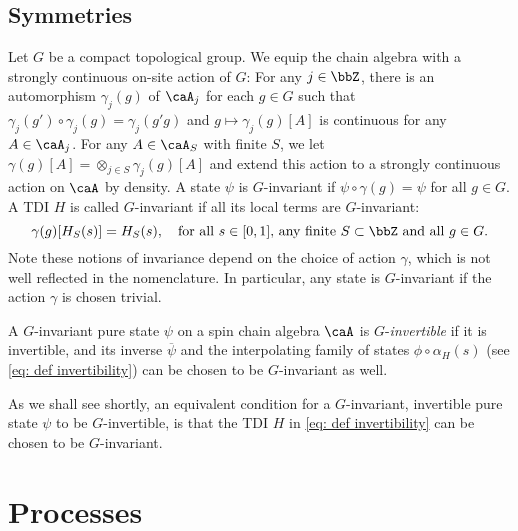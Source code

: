 \subsection{Symmetries}\label{sec: symmetries}
Let $G$ be a compact topological group. We equip the chain algebra with a strongly continuous on-site action of $G$: For any $j\in \bbZ$, there is an automorphism $\gamma_{j}(g)$ of $\caA_j$ for each $g\in G$ such that $\gamma_{j}(g')\circ \gamma_{j}(g)=\gamma_{j}(g'g)$ and $g\mapsto \gamma_j(g)[A]$ is continuous for any $A\in \caA_j$. For any $A\in\caA_S$ with finite $S$, we let $\gamma(g)[A]=\otimes_{j\in S}\gamma_{j}(g)[A]$ and extend this action to a strongly continuous action  on $\caA$ by density. A state $\psi$ is $G$-invariant if  $\psi \circ \gamma(g)=\psi$ for all $g\in G$. 
A TDI $H$ is called $G$-invariant if all its local terms are $G$-invariant: 
$$
\gamma(g)[H_S(s)]=H_S(s), \quad \text{for all $s\in[0,1]$, any finite $S \subset \bbZ$ and all $g\in G$}.
$$
Note these notions of invariance depend on the choice of action $\gamma$, which is not well reflected in the nomenclature. In particular, any state is $G$-invariant if the action $\gamma$ is chosen trivial. 

\begin{definition}
	A $G$-invariant pure state $\psi$ on a spin chain algebra $\caA$ is $G$-\emph{invertible} if it is invertible, and its inverse $\overline{\psi}$ and the interpolating family of states $\phi\circ\alpha_H(s)$ (see \eqref{eq: def invertibility}) can be chosen to be $G$-invariant as well. 
\end{definition}
As we shall see shortly, an equivalent condition for a $G$-invariant, invertible pure state $\psi$ to be $G$-invertible, is that the TDI $H$ in \eqref{eq: def invertibility} can be chosen to be $G$-invariant.  




\section{Processes}\label{sec: processes}

